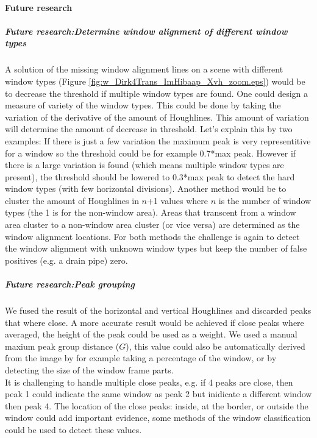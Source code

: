 \paragraph{Future research}
\subparagraph{Future research:Determine window alignment of different window types}
A solution of the missing window alignment lines on a scene with different
window types (Figure \ref{fig:w_Dirk4Trans_ImHibaap_Xvh_zoom.eps}) would be to
decrease the threshold if multiple window types are found. One could design a
measure of variety of the window types. This could be done by taking the variation of the
derivative of the amount of Houghlines. This amount of variation will determine
the amount of decrease in threshold. Let's explain this by two examples:
If there is just a few variation the maximum peak is very representitive for a
window so the threshold could be for example 0.7*max peak. However if there is a
large variation is found (which means multiple window types are present), the
threshold should be lowered to 0.3*max peak to detect the hard window types
(with few horizontal divisions).
Another method would be to cluster the amount of Houghlines in $n$+1 values
where $n$ is the number of window types (the 1 is for the non-window area).
Areas that transcent from a window area cluster to a non-window area cluster
(or vice versa) are determined as the window alignment locations.
For both methods the challenge is again to detect the window alignment with
unknown window types but keep the number of false positives (e.g. a drain pipe)
zero.

\subparagraph{Future research:Peak grouping}
We fused the result of the horizontal and vertical Houghlines and discarded
peaks that where close.  A more accurate result would be achieved if close peaks
where averaged, the height of the peak could be used as a weight.  We used a
manual maxium peak group distance ($G$), this value could also be automatically
derived from the image by for example taking a percentage of the window, or by
detecting the size of the window frame parts.\\ It is challenging to handle
multiple close peaks, e.g. if 4 peaks are close, then peak 1 could indicate the
same window as peak 2 but inidicate a different window then peak 4. The location
of the close peaks: inside, at the border, or outside the window could add
important evidence, some methods of the window classification could be used to
detect these values.


